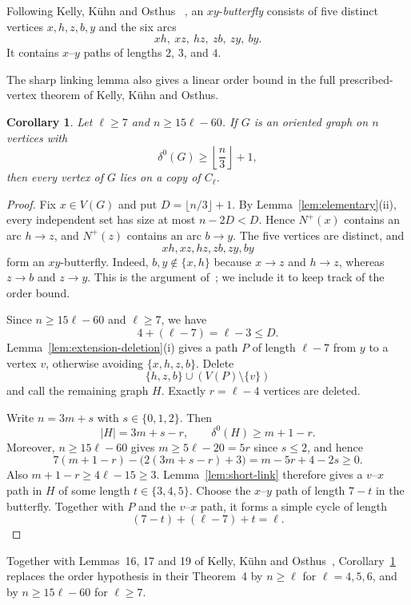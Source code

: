 \documentclass[11pt]{amsart}
\newtheorem{corollary}[theorem]{Corollary}
\theoremstyle{definition}
\begin{document}
Following Kelly, K\"uhn and Osthus
~\cite[discussion preceding Fact~18]{KKO}, an $xy$-\emph{butterfly}
consists of five distinct vertices $x,h,z,b,y$ and the six arcs
\[
  xh,\ xz,\ hz,\ zb,\ zy,\ by.
\]
It contains $x$--$y$ paths of lengths $2$, $3$, and $4$.

The sharp linking lemma also gives a linear order bound in the full
prescribed-vertex theorem of Kelly, K\"uhn and Osthus.

\begin{corollary}
\label{cor:kko-linear}
Let $\ell\ge7$ and $n\ge15\ell-60$.  If $G$ is an oriented graph on
$n$ vertices with
\[
  \delta^0(G)\ge\left\lfloor\frac n3\right\rfloor+1,
\]
then every vertex of $G$ lies on a copy of $C_\ell$.
\end{corollary}

\begin{proof}
Fix $x\in V(G)$ and put $D=\lfloor n/3\rfloor+1$.  By
Lemma~\ref{lem:elementary}(ii), every independent set has size at most
$n-2D<D$.  Hence $N^+(x)$ contains an arc $h\to z$, and $N^+(z)$
contains an arc $b\to y$.  The five vertices are distinct, and
\[
  xh,xz,hz,zb,zy,by
\]
form an $xy$-butterfly.
Indeed, $b,y\notin\{x,h\}$ because $x\to z$ and $h\to z$, whereas
$z\to b$ and $z\to y$.
This is the argument of~\cite[Fact~18]{KKO}; we include it to keep
track of the order bound.

Since $n\ge15\ell-60$ and $\ell\ge7$, we have
\[
  4+(\ell-7)=\ell-3\le D.
\]
Lemma~\ref{lem:extension-deletion}(i) gives a path $P$ of length
$\ell-7$ from $y$ to a vertex $v$, otherwise avoiding
$\{x,h,z,b\}$.  Delete
\[
  \{h,z,b\}\cup(V(P)\setminus\{v\})
\]
and call the remaining graph $H$.  Exactly $r=\ell-4$ vertices are
deleted.

Write $n=3m+s$ with $s\in\{0,1,2\}$.  Then
\[
  |H|=3m+s-r,
  \qquad
  \delta^0(H)\ge m+1-r.
\]
Moreover, $n\ge15\ell-60$ gives $m\ge5\ell-20=5r$ since $s\le2$, and hence
\[
  7(m+1-r)-\bigl(2(3m+s-r)+3\bigr)
  =m-5r+4-2s\ge0.
\]
Also $m+1-r\ge4\ell-15\ge3$.  Lemma~\ref{lem:short-link} therefore
gives a $v$--$x$ path in $H$ of some length
$t\in\{3,4,5\}$.  Choose the $x$--$y$ path of length $7-t$ in the
butterfly.  Together with $P$ and the $v$--$x$ path, it forms a simple
cycle of length
\[
  (7-t)+(\ell-7)+t=\ell.
\]
\end{proof}

Together with Lemmas~16, 17 and 19 of Kelly, K\"uhn and
Osthus~\cite{KKO}, Corollary~\ref{cor:kko-linear} replaces the order
hypothesis in their Theorem~4 by $n\ge\ell$ for $\ell=4,5,6$, and by
$n\ge15\ell-60$ for $\ell\ge7$.
\end{document}
